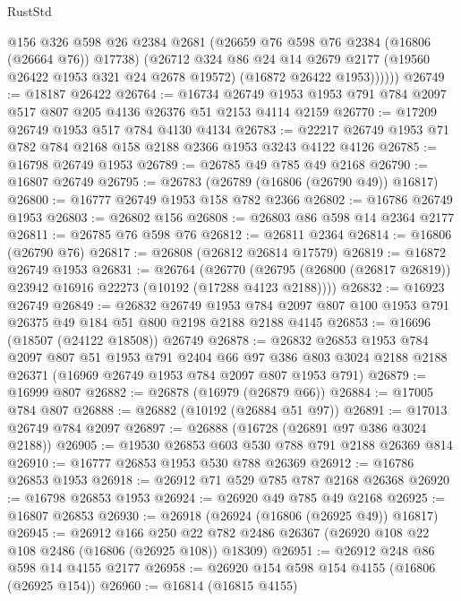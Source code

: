 \begin{lexlean}{RustStd}
\begin{coremodule}
            @156
            @326
            @598
            @26
            @2384
            @2681
            (@26659 @76 @598 @76 @2384 (@16806 (@26664 @76)) @17738)
            (@26712
              @324
              @86
              @24
              @14
              @2679
              @2177
              (@19560 @26422 @1953 @321 @24 @2678 @19572)
              (@16872 @26422 @1953))))))
@26749 := @18187 @26422
@26764 := @16734
    @26749
    @1953
    @1953
    @791
    @784
    @2097
    @517
    @807
    @205
    @4136
    @26376
    @51
    @2153
    @4114
    @2159
@26770 := @17209 @26749 @1953 @517 @784 @4130 @4134
@26783 := @22217 @26749 @1953 @71 @782 @784 @2168 @158 @2188 @2366 @1953 @3243 @4122 @4126
@26785 := @16798 @26749 @1953
@26789 := @26785 @49 @785 @49 @2168
@26790 := @16807 @26749
@26795 := @26783 (@26789 (@16806 (@26790 @49)) @16817)
@26800 := @16777 @26749 @1953 @158 @782 @2366
@26802 := @16786 @26749 @1953
@26803 := @26802 @156
@26808 := @26803 @86 @598 @14 @2364 @2177
@26811 := @26785 @76 @598 @76
@26812 := @26811 @2364
@26814 := @16806 (@26790 @76)
@26817 := @26808 (@26812 @26814 @17579)
@26819 := @16872 @26749 @1953
@26831 := @26764
    (@26770 (@26795 (@26800 (@26817 @26819)) @23942 @16916 @22273 (@10192 (@17288 @4123 @2188))))
@26832 := @16923 @26749
@26849 := @26832
    @26749
    @1953
    @784
    @2097
    @807
    @100
    @1953
    @791
    @26375
    @49
    @184
    @51
    @800
    @2198
    @2188
    @2188
    @4145
@26853 := @16696 (@18507 (@24122 @18508)) @26749
@26878 := @26832
    @26853
    @1953
    @784
    @2097
    @807
    @51
    @1953
    @791
    @2404
    @66
    @97
    @386
    @803
    @3024
    @2188
    @2188
    @26371
    (@16969 @26749 @1953 @784 @2097 @807 @1953 @791)
@26879 := @16999 @807
@26882 := @26878 (@16979 (@26879 @66))
@26884 := @17005 @784 @807
@26888 := @26882 (@10192 (@26884 @51 @97))
@26891 := @17013 @26749 @784 @2097
@26897 := @26888 (@16728 (@26891 @97 @386 @3024 @2188))
@26905 := @19530 @26853 @603 @530 @788 @791 @2188 @26369 @814
@26910 := @16777 @26853 @1953 @530 @788 @26369
@26912 := @16786 @26853 @1953
@26918 := @26912 @71 @529 @785 @787 @2168 @26368
@26920 := @16798 @26853 @1953
@26924 := @26920 @49 @785 @49 @2168
@26925 := @16807 @26853
@26930 := @26918 (@26924 (@16806 (@26925 @49)) @16817)
@26945 := @26912
    @166
    @250
    @22
    @782
    @2486
    @26367
    (@26920 @108 @22 @108 @2486 (@16806 (@26925 @108)) @18309)
@26951 := @26912 @248 @86 @598 @14 @4155 @2177
@26958 := @26920 @154 @598 @154 @4155 (@16806 (@26925 @154))
@26960 := @16814 (@16815 @4155)

\end{coremodule}
\end{lexlean}
